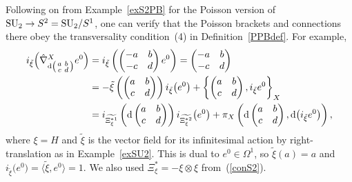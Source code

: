 \documentclass[pdftex]{sigma}
\numberwithin{equation}{section}
\newcommand{\<}{{\langle}}
\renewcommand{\>}{{\rangle}}
\newcommand{\tens}{\otimes}
\newcommand{\extd}{{\rm d}}
\begin{document}
\begin{Example}\label{exspherebun} Following on from Example~\ref{exS2PB} for the Poisson version of ${\rm SU}_2\to S^2={\rm SU}_2/S^1$, one can verify that the Poisson brackets and connections there obey the transversality condition~(4) in Definition~\ref{PPBdef}. For example,
\begin{align*}
i_{\tilde\xi}\Big(\hat\nabla^X_{\extd \left(\begin{smallmatrix} a & b \\ c & d\end{smallmatrix}\right)}e^0\Big)&=i_{\tilde\xi}\left( \begin{pmatrix} -a & b \\ -c & d\end{pmatrix}e^0\right)= \begin{pmatrix} -a & b \\ -c & d\end{pmatrix}\\
&=-\tilde{\xi}\left( \begin{pmatrix} a & b \\ c & d\end{pmatrix}\right)i_{\tilde\xi}\big(e^0\big)+\left\{ \begin{pmatrix} a & b \\ c & d\end{pmatrix},i_{\tilde\xi}e^0\right\}_X\\
&=i_{\widetilde{\Xi_\xi^{*1}}}\left(\extd \begin{pmatrix} a & b \\ c & d\end{pmatrix}\right)i_{\widetilde{\Xi_\xi^{*2}}}\big(e^0\big)+\pi_X\left(\extd \begin{pmatrix} a & b \\ c & d\end{pmatrix},\extd\big(i_{\tilde\xi}e^0\big)\right),\end{align*}
where $\xi=H$ and $\tilde\xi$ is the vector field for its infinitesimal action by right-translation as in Example~\ref{exSU2}. This is dual to $e^0\in\Omega^1$, so $\tilde\xi(a)=a$ and $i_{\tilde\xi}\big(e^0\big)=\big\langle \tilde\xi,e^0\big\rangle=1$. We also used $\Xi_\xi^*=-\xi\tens\xi$ from~(\ref{conS2}).


\end{Example}
\end{document}
